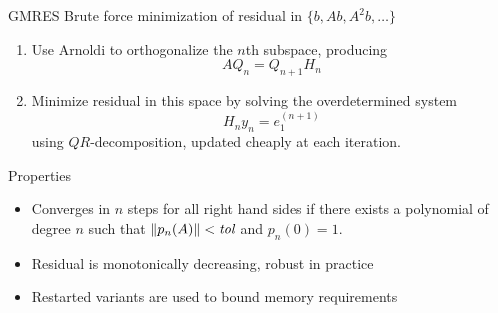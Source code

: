 \begin{frame}{GMRES}
  Brute force minimization of residual in $\{b,Ab,A^2b,\dotsc\}$
  \begin{enumerate}
  \item Use Arnoldi to orthogonalize the $n$th subspace, producing
    \[ A Q_n = Q_{n+1} H_n \]
  \item Minimize residual in this space by solving the overdetermined system
    \[ H_n y_n = e_1^{(n+1)} \]
    using $QR$-decomposition, updated cheaply at each iteration.
  \end{enumerate}
  Properties
  \begin{itemize}
  \item Converges in $n$ steps for all right hand sides if there exists a polynomial of degree $n$
    such that $\left\lVert p_n(A) \right\rVert < \textit{tol}$ and $p_n(0)=1$.
  \item Residual is monotonically decreasing, robust in practice
  \item Restarted variants are used to bound memory requirements
  \end{itemize}
\end{frame}
